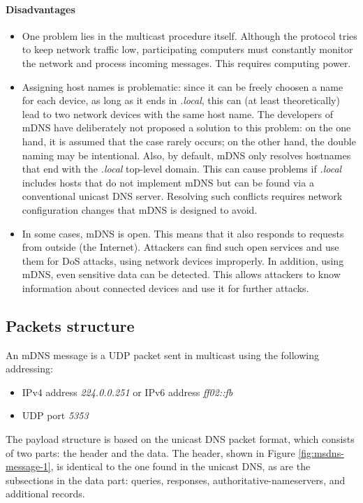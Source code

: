 \documentclass[fleqn, 11pt]{SelfArx} %
\begin{document}
\paragraph{Disadvantages} 
\begin{itemize}[leftmargin=*]
    \item One problem lies in the multicast procedure itself. Although the protocol tries to keep network traffic low, participating computers must constantly monitor the network and process incoming messages. This requires computing power.
    \item Assigning host names is problematic: since it can be freely choosen a name for each device, as long as it ends in {\it{.local}}, this can (at least theoretically) lead to two network devices with the same host name. The developers of mDNS have deliberately not proposed a solution to this problem: on the one hand, it is assumed that the case rarely occurs; on the other hand, the double naming may be intentional. \newline 
    Also, by default, mDNS only resolves hostnames that end with the {\it{.local}} top-level domain. This can cause problems if {\it{.local}} includes hosts that do not implement mDNS but can be found via a conventional unicast DNS server. Resolving such conflicts requires network configuration changes that mDNS is designed to avoid.
    \item In some cases, mDNS is open. This means that it also responds to requests from outside (the Internet). Attackers can find such open services and use them for DoS attacks, using network devices improperly. \newline
    In addition, using mDNS, even sensitive data can be detected. This allows attackers to know information about connected devices and use it for further attacks.
\end{itemize}

\subsection{Packets structure}
An mDNS message is a UDP packet sent in multicast using the following addressing:
\begin{itemize}[leftmargin=*]
    \item IPv4 address \textit{224.0.0.251} or IPv6 address \textit{ff02::fb}
    \item UDP port \textit{5353}
\end{itemize}
The payload structure is based on the unicast DNS packet format, which consists of two parts: the header and the data.\newline
The header, shown in Figure \ref{fig:msdns-message-1}, is identical to the one found in the unicast DNS, as are the subsections in the data part: queries, responses, authoritative-nameservers, and additional records.
\end{document}
